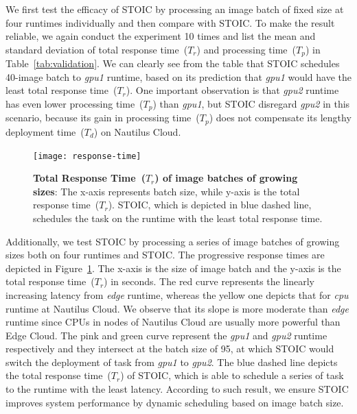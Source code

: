 We first test the efficacy of STOIC by processing an image batch of fixed size at four runtimes individually and then compare with STOIC. To make the result reliable, we again conduct the experiment 10 times and list the mean and standard deviation of total response time~($T_r$) and processing time~($T_p$) in Table~\ref{tab:validation}. We can clearly see from the table that STOIC schedules 40-image batch to \textit{gpu1} runtime, based on its prediction that  \textit{gpu1} would have the least total response time~($T_r$). One important observation is that \textit{gpu2} runtime has even lower processing time~($T_p$) than \textit{gpu1}, but STOIC disregard \textit{gpu2} in this scenario, because its gain in processing time~($T_p$) does not compensate its lengthy deployment time~($T_d$) on Nautilus Cloud.

\begin{figure}[t] \centering 
\texttt{[image: response-time]}
\caption{\textbf{Total Response Time~($T_r$) of image batches of growing sizes}: The x-axis represents batch size, while y-axis is the total response time~($T_r$). STOIC, which is depicted in blue dashed line, schedules the task on the runtime with the least total response time.  
\label{fig:response-time}}
\end{figure}

Additionally, we test STOIC by processing a series of image batches of growing sizes both on four runtimes and STOIC. The progressive response times are depicted in Figure~\ref{fig:response-time}. The x-axis is the size of image batch and the y-axis is the total response time~($T_r$) in seconds. The red curve represents the linearly increasing latency from \textit{edge} runtime, whereas the yellow one depicts that for \textit{cpu} runtime at Nautilus Cloud. We observe that its slope is more moderate than \textit{edge} runtime since CPUs in nodes of Nautilus Cloud are usually more powerful than Edge Cloud. The pink and green curve represent the \textit{gpu1} and \textit{gpu2} runtime respectively and they intersect at the batch size of 95, at which STOIC would switch the deployment of task from \textit{gpu1} to \textit{gpu2}. The blue dashed line depicts the total response time~($T_r$) of STOIC, which is able to schedule a series of task to the runtime with the least latency. According to such result, we ensure STOIC improves system performance by dynamic scheduling based on image batch size.


